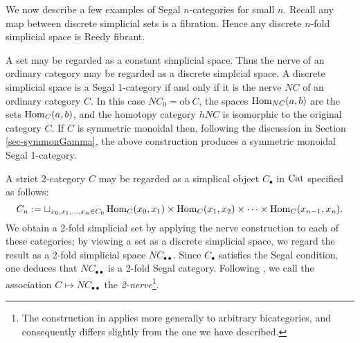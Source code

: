 \documentclass[a4paper]{amsart}
\begin{document}
 We now describe a few examples of Segal $n$-categories for small $n$. Recall any map between discrete simplicial sets is a fibration. Hence any discrete $n$-fold simplicial space is Reedy fibrant. 




\begin{example}
	A set may be regarded as a constant simplicial space. Thus the nerve of an ordinary category may be regarded as a discrete simplcial space. A discrete simplicial space is a Segal 1-category if and only if it is the nerve $NC$ of an ordinary category $C$. In this case $NC_0 = \textrm{ob}\ C$, the spaces $\operatorname{Hom}_{NC}(a,b)$ are the sets $\operatorname{Hom}_C(a,b)$, and the homotopy category $\mathit{h}NC$ is isomorphic to the original category $C$. If $C$ is symmetric monoidal then, following the discussion in Section \ref{sec-symmonGamma}, the above construction produces a symmetric monoidal Segal 1-category.  
\end{example}

\begin{example}
	A strict 2-category $C$ may be regarded as a simplical object $C_\bullet$ in $\mathrm{Cat}$ specified as follows:
	\begin{equation*}
		C_n := \sqcup_{x_0, x_1, \dots, x_n \in C_0} \operatorname{Hom}_C(x_0, x_1) \times \operatorname{Hom}_C(x_1, x_2) \times \cdots \times \operatorname{Hom}_C(x_{n-1}, x_n).
	\end{equation*}
	We obtain a 2-fold simplicial set by applying the nerve construction to each of these categories; by viewing a set as a discrete simplicial space, we regard the result as a 2-fold simplicial space $NC_{\bullet \bullet}$. Since $C_\bullet$ satisfies the Segal condition, one deduces that $NC_{\bullet \bullet}$ is a 2-fold Segal category. 
Following \cite{MR2366560}, we call the association $C \mapsto NC_{\bullet \bullet}$ the {\em 2-nerve}\footnote{The construction in \cite{MR2366560} applies more generally to arbitrary bicategories, and consequently differs slightly from the one we have described.}.  
\end{example}
\end{document}
